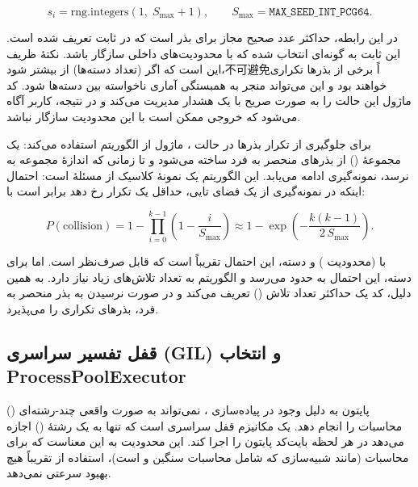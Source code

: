 \begin{equation}
	s_i = \text{rng.integers}\!\left(1,\; S_{\max} + 1\right), \qquad S_{\max} = \texttt{MAX\_SEED\_INT\_PCG64}.
\end{equation}

\noindent در این رابطه،  حداکثر عدد صحیح مجاز برای بذر  است که در ثابت  تعریف شده است. این ثابت به گونه‌ای انتخاب شده که با محدودیت‌های داخلی  سازگار باشد. نکتۀ ظریف این است که اگر  (تعداد دسته‌ها) از  بیشتر شود،不可避免اً برخی از بذرها تکراری خواهند بود و این می‌تواند منجر به همبستگی آماری ناخواسته بین دسته‌ها شود. کد ماژول این حالت را به صورت صریح با یک هشدار  مدیریت می‌کند و در نتیجه، کاربر آگاه می‌شود که خروجی ممکن است با این محدودیت سازگار نباشد.

برای جلوگیری از تکرار بذرها در حالت ، ماژول از الگوریتم  استفاده می‌کند: یک مجموعۀ () از بذرهای منحصر به فرد ساخته می‌شود و تا زمانی که اندازۀ مجموعه به  نرسد، نمونه‌گیری ادامه می‌یابد. این الگوریتم یک نمونۀ کلاسیک از مسئلۀ  است: احتمال اینکه در  نمونه‌گیری از یک فضای تایی، حداقل یک تکرار رخ دهد برابر است با:

\begin{equation}
	P(\text{collision}) = 1 - \prod_{i=0}^{k-1} \left( 1 - \frac{i}{S_{\max}} \right) \approx 1 - \exp\!\left( -\frac{k(k-1)}{2\, S_{\max}} \right).
\end{equation}

\noindent با  (محدودیت ) و  دسته، این احتمال تقریباً  است که قابل صرف‌نظر است. اما برای  دسته، این احتمال به حدود  می‌رسد و الگوریتم  به تعداد تلاش‌های زیاد نیاز دارد. به همین دلیل، کد یک حداکثر تعداد تلاش () تعریف می‌کند و در صورت نرسیدن به  بذر منحصر به فرد، بذرهای تکراری را می‌پذیرد.

\subsection{قفل تفسیر سراسری (GIL) و انتخاب ProcessPoolExecutor}

پایتون به دلیل وجود  در پیاده‌سازی ، نمی‌تواند به صورت واقعی چند-رشته‌ای () محاسبات  را انجام دهد.  یک مکانیزم قفل سراسری است که تنها به یک رشتۀ () اجازه می‌دهد در هر لحظه بایت‌کد پایتون را اجرا کند. این محدودیت به این معناست که برای محاسبات  (مانند شبیه‌سازی  که شامل محاسبات سنگین  و  است)، استفاده از  تقریباً هیچ بهبود سرعتی نمی‌دهد.

